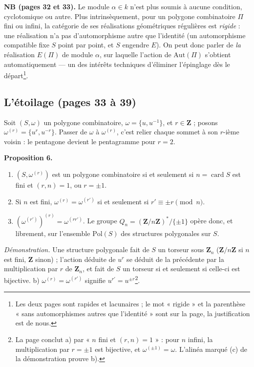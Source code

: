 \documentclass[11pt,a4paper]{article}
\begin{document}
\textbf{NB (pages 32 et 33).} Le module $\alpha \in k$ n'est plus soumis à
aucune condition, cyclotomique ou autre. Plus intrinsèquement, pour un polygone
combinatoire $\Pi$ fini ou infini, la catégorie de ses réalisations
géométriques régulières est \emph{rigide} : une réalisation n'a pas
d'automorphisme autre que l'identité (un automorphisme compatible fixe $S$
point par point, et $S$ engendre $E$). On peut donc parler de \emph{la}
réalisation $E(\Pi)$ de module $\alpha$, sur laquelle l'action de
$\mathrm{Aut}(\Pi)$ s'obtient automatiquement --- un des intérêts techniques
d'éliminer l'épinglage dès le départ\footnote{Les deux pages sont rapides et
lacunaires ; le mot « rigide » et la parenthèse « sans automorphismes autres
que l'identité » sont sur la page, la justification est de nous.}.

\subsection*{L'étoilage (pages 33 à 39)}

Soit $(S, \omega)$ un polygone combinatoire, $\omega = \{u, u^{-1}\}$, et $r
\in \mathbf{Z}$ ; posons $\omega^{(r)} = \{u^r, u^{-r}\}$. Passer de $\omega$
à $\omega^{(r)}$, c'est relier chaque sommet à son $r$-ième voisin : le
pentagone devient le pentagramme pour $r = 2$.

\textbf{Proposition 6.}
\begin{enumerate}
  \item[a)] $(S, \omega^{(r)})$ est un polygone combinatoire si et seulement si
    $n = \operatorname{card} S$ est fini et $(r, n) = 1$, ou $r = \pm 1$.
  \item[b)] Si $n$ est fini, $\omega^{(r)} = \omega^{(r')}$ si et seulement si
    $r' \equiv \pm r \pmod n$.
  \item[c)] $(\omega^{(r')})^{(r)} = \omega^{(rr')}$. Le groupe $Q_n =
    (\mathbf{Z}/n\mathbf{Z})^{*}/\{\pm 1\}$ opère donc, et librement, sur
    l'ensemble $\mathrm{Pol}(S)$ des structures polygonales sur $S$.
\end{enumerate}
\emph{Démonstration.} Une structure polygonale fait de $S$ un torseur sous
$\mathbf{Z}_n$ ($\mathbf{Z}/n\mathbf{Z}$ si $n$ est fini, $\mathbf{Z}$ sinon) ;
l'action déduite de $u^r$ se déduit de la précédente par la multiplication par
$r$ de $\mathbf{Z}_n$, et fait de $S$ un torseur si et seulement si celle-ci
est bijective. b) $\omega^{(r)} = \omega^{(r')}$ signifie $u^{r'} = u^{\pm
r}$\footnote{La page conclut a) par « $n$ fini et $(r, n) = 1$ » : pour $n$
infini, la multiplication par $r = \pm 1$ est bijective, et $\omega^{(\pm 1)}
= \omega$. L'alinéa marqué (c) de la démonstration prouve b).}.
\end{document}

